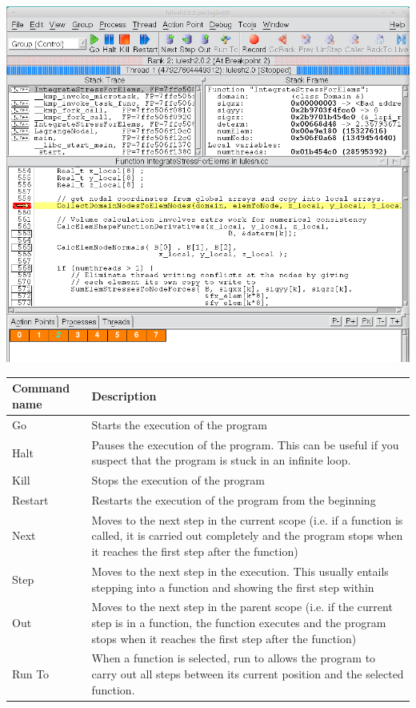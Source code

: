 \documentclass[10pt, letterpaper, twoside]{article}
\begin{document}
\begin{titlepage}
\begin{enumerate}
\begin{enumerate}
\hspace{15mm}
\includegraphics[scale = 0.5]{totalview.png}
\vspace{10mm}
\hspace{15mm}
\\
\begin{table}
\centering
\begin{tabular}{| p{2cm} | p{10cm} |}
\hline
\textbf{Command name} & \textbf{Description} \\ \hline
Go                   & Starts the execution of the program                   \\ \hline
Halt                  & Pauses the execution of the program. This can be useful if you suspect that the program is stuck in an infinite loop.                \\ \hline
Kill                 & Stops the execution of the program						   \\ \hline
Restart                 & Restarts the execution of the program from the beginning						   \\ \hline
Next                 & Moves to the next step in the current scope (i.e. if a function is called, it is carried out completely and the program stops when it reaches the first step after the function)						   \\ \hline
Step                 & Moves to the next step in the execution. This usually entails stepping into a function and showing the first step within						   \\ \hline
Out                 & Moves to the next step in the parent scope (i.e. if the current step is in a function, the function executes and the program stops when it reaches the first step after the function)						   \\ \hline
Run To                 & When a function is selected, run to allows the program to carry out all steps between its current position and the selected function.					   \\ \hline


\end{tabular}
\end{table}
\end{enumerate}
\end{enumerate}
\end{titlepage}
\end{document}
